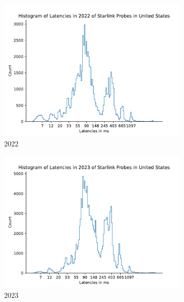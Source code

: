 \begin{figure}
	\centering
	\begin{subfigure}[b]{0.3\linewidth}
		\includegraphics[width=\linewidth]{chapters/4-results/latency/img/histogram_of_latencies_in_2022_of_starlink_probes_in_united_states.pdf}
		\caption{2022}
	\end{subfigure}
	\begin{subfigure}[b]{0.3\linewidth}
		\includegraphics[width=\linewidth]{chapters/4-results/latency/img/histogram_of_latencies_in_2023_of_starlink_probes_in_united_states.pdf}
		\caption{2023}
	\end{subfigure}
	\begin{subfigure}[b]{0.3\linewidth}

\end{subfigure}
\end{figure}
